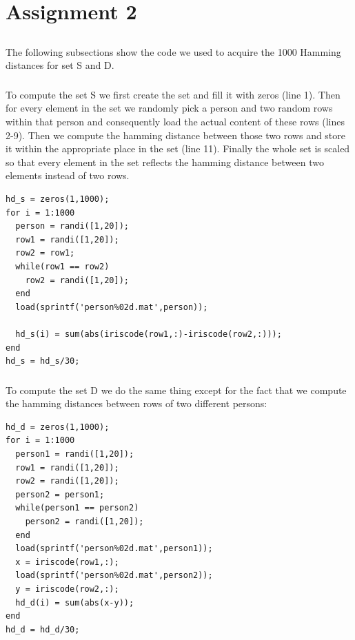 \documentclass{article}
\begin{document}
\section{Assignment 2}
\subsection{}
The following subsections show the code we used to acquire the 1000 Hamming distances for set S and D.
\subsubsection{}
To compute the set S we first create the set and fill it with zeros (line 1). Then for every element in the set we randomly pick a person and two random rows within that person and consequently load the actual content of these rows (lines 2-9). Then we compute the hamming distance between those two rows and store it within the appropriate place in the set (line 11). Finally the whole set is scaled so that every element in the set reflects the hamming distance between two elements instead of two rows.
\begin{lstlisting}[title = Code for set S]
hd_s = zeros(1,1000);
for i = 1:1000
  person = randi([1,20]);
  row1 = randi([1,20]);
  row2 = row1;
  while(row1 == row2)
    row2 = randi([1,20]);
  end
  load(sprintf('person%02d.mat',person));

  hd_s(i) = sum(abs(iriscode(row1,:)-iriscode(row2,:)));
end
hd_s = hd_s/30;
\end{lstlisting}
\subsubsection{}
To compute the set D we do the same thing except for the fact that we compute the hamming distances between rows of two different persons:
\begin{lstlisting}[title = Code for set D]
hd_d = zeros(1,1000);
for i = 1:1000
  person1 = randi([1,20]);
  row1 = randi([1,20]);
  row2 = randi([1,20]);
  person2 = person1;
  while(person1 == person2)
    person2 = randi([1,20]);
  end
  load(sprintf('person%02d.mat',person1));
  x = iriscode(row1,:);
  load(sprintf('person%02d.mat',person2));
  y = iriscode(row2,:);
  hd_d(i) = sum(abs(x-y));
end
hd_d = hd_d/30;
\end{lstlisting}
\end{document}
